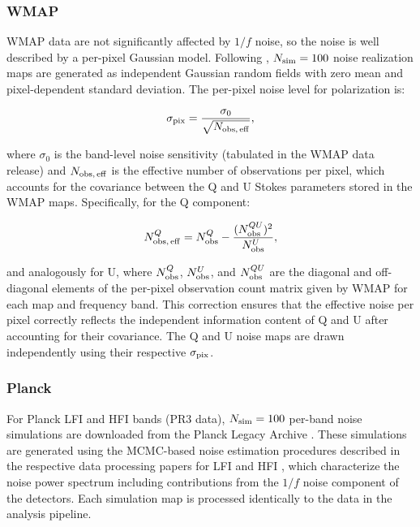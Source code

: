 \subsubsection*{WMAP}

WMAP data are not significantly affected by $1/f$ noise, so the noise is well described by a per-pixel Gaussian model. Following \citet{WMAP_maps}, $N_{\rm sim} = 100$ noise realization maps are generated as independent Gaussian random fields with zero mean and pixel-dependent standard deviation. The per-pixel noise level for polarization is:

\begin{equation}
    \label{eq:wmap_noise}
    \sigma_{\rm pix} = \frac{\sigma_0}{\sqrt{N_{\rm obs,\,eff}}},
\end{equation}

where $\sigma_0$ is the band-level noise sensitivity (tabulated in the WMAP data release) and $N_{\rm obs,\,eff}$ is the effective number of observations per pixel, which accounts for the covariance between the Q and U Stokes parameters stored in the WMAP maps. Specifically, for the Q component:

\begin{equation}
    N_{\rm obs,\,eff}^Q = N_{\rm obs}^Q - \frac{(N_{\rm obs}^{QU})^2}{N_{\rm obs}^U},
\end{equation}

and analogously for U, where $N_{\rm obs}^Q$, $N_{\rm obs}^U$, and $N_{\rm obs}^{QU}$ are the diagonal and off-diagonal elements of the per-pixel observation count matrix given by WMAP for each map and frequency band. This correction ensures that the effective noise per pixel correctly reflects the independent information content of Q and U after accounting for their covariance. The Q and U noise maps are drawn independently using their respective $\sigma_{\rm pix}$.

\subsubsection*{Planck} 

For Planck LFI and HFI bands (PR3 data), $N_{\rm sim} = 100$ per-band noise simulations are downloaded from the Planck Legacy Archive \citep{Planck_2020LVII}. These simulations are generated using the MCMC-based noise estimation procedures described in the respective data processing papers for LFI \citep{Planck_2015II} and HFI \citep{Planck_2018III}, which characterize the noise power spectrum including contributions from the $1/f$ noise component of the detectors. Each simulation map is processed identically to the data in the analysis pipeline.

